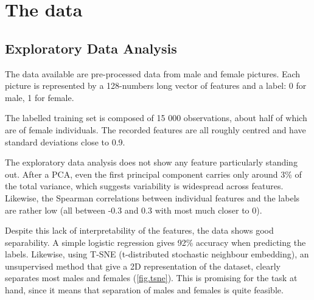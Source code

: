 \documentclass[a4paper,11pt,openany,extrafontsizes,oneside,article,twocolumn]{memoir}
\begin{document}



\chapter{The data}

\section{Exploratory Data Analysis}

The data available are pre-processed data from male and female
pictures. Each picture is represented by a 128-numbers long vector of
features and a label: 0 for male, 1 for female.

The labelled training set is composed of 15 000 observations, about
half of which are of female individuals. The recorded features are all
roughly centred and have standard deviations close to 0.9.

The exploratory data analysis does not show any feature particularly
standing out. After a PCA, even the first principal component carries
only around 3\% of the total variance, which suggests variability is
widespread across features. Likewise, the Spearman correlations
between individual features and the labels are rather low (all between
-0.3 and 0.3 with most much closer to 0).

Despite this lack of interpretability of the features, the data shows
good separability. A simple logistic regression gives 92\% accuracy
when predicting the labels. Likewise, using T-SNE (t-distributed
stochastic neighbour embedding), an unsupervised method that give a 2D
representation of the dataset, clearly separates most males and
females (\autoref{fig.tsne}). This is promising for the task at hand,
since it means that separation of males and females is quite feasible.
\end{document}
